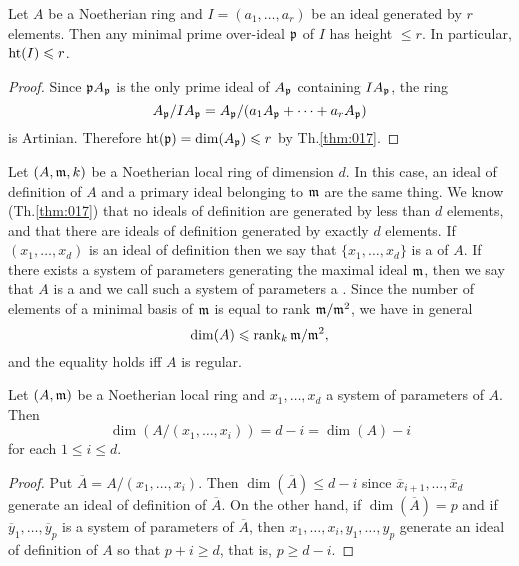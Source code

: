 \documentclass[../main]{subfiles}
\begin{document}
\begin{partheorem}\label{thm:018}
Let $A$ be a Noetherian ring and $I=(a_1, \ldots, a_r)$ be an ideal generated by $r$ elements. Then any minimal prime over-ideal $\mathfrak{p}$ of $I$ has height $\leqslant r$. In particular, $\operatorname{ht}(I)\leqslant r$.
\end{partheorem}

\begin{proof}
Since $\mathfrak{p}A_{\mathfrak{p}}$ is the only prime ideal of $A_{\mathfrak{p}}$ containing $IA_{\mathfrak{p}}$, the ring \[A_{\mathfrak{p}}/IA_{\mathfrak{p}}=A_{\mathfrak{p}} /(a_1 A_{\mathfrak{p}}+\cdots+a_r A_{\mathfrak{p}})\] is Artinian. Therefore $\operatorname{ht}(\mathfrak{p})=\operatorname{dim}(A_{\mathfrak{p}}) \leqslant r$ by Th.\ref{thm:017}.
\end{proof} 

\newparagraph Let $(A, \mathfrak{m}, k)$ be a Noetherian local ring of dimension $d$. In this case, an ideal of definition of $A$ and a primary ideal belonging to $\mathfrak{m}$ are the same thing. We know (Th.\ref{thm:017}) that no ideals of definition are generated by less than $d$ elements, and that there are ideals of definition generated by exactly $d$ elements. If $(x_1, \ldots, x_d)$ is an ideal of definition then we say that $\{x_1, \ldots, x_d\}$ is a  of $A$. If there exists a system of parameters generating the maximal ideal $\mathfrak{m}$, then we say that $A$ is a  and we call such a system of parameters a . Since the number of elements of a minimal basis of $\mathfrak{m}$ is equal to rank $\mathfrak{m} / \mathfrak{m}^2$, we have in general \[\operatorname{dim}(A) \leqslant\operatorname{rank}_k\mathfrak{m} / \mathfrak{m}^2,\] and the equality holds iff $A$ is regular.

\begin{parproposition}\label{pro:12.02}
Let $(A, \mathfrak{m})$ be a Noetherian local ring and $x_1, \ldots, x_d$ a system of parameters of $A$. Then \[\dim(A/(x_1, \ldots, x_i))=d-i=\dim(A)-i\] for each $1 \leqslant i \leqslant d$.
\end{parproposition}

\begin{proof}
Put $\overline{A}=A/(x_1, \ldots, x_i)$. Then $\dim(\overline{A}) \leqslant d-i$ since $\overline{x}_{i+1}, \ldots, \overline{x}_d$ generate an ideal of definition of $\overline{A}$. On the other hand, if $\dim(\overline{A})=p$ and if $\overline{y}_1, \ldots, \overline{y}_p$ is a system of parameters of $\overline{A}$, then $x_1, \ldots, x_i, y_1, \ldots, y_p$ generate an ideal of definition of $A$ so that $p+i \geqslant d$, that is, $p \geqslant d-i$.
\end{proof}
\end{document}
